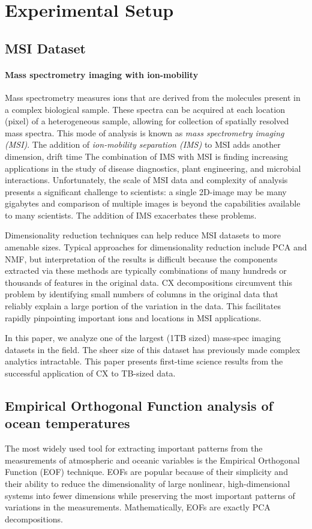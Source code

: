 \section{Experimental Setup}
\label{sec:setup}

\subsection{MSI Dataset}
\paragraph{Mass spectrometry imaging with ion-mobility}
Mass spectrometry measures ions that are derived from the molecules present in a complex biological sample.
These spectra can be acquired at each location (pixel) of a heterogeneous sample, allowing for collection of spatially
resolved mass spectra.
This mode of analysis is known as \textit{mass spectrometry imaging (MSI)}.
The addition of \textit{ion-mobility separation (IMS)} to MSI adds another dimension, drift time
The combination of IMS with MSI is finding increasing applications in the study of disease diagnostics, plant
engineering, and microbial interactions. Unfortunately, the scale of MSI data and complexity of analysis presents a significant challenge to
scientists: a single 2D-image may be many gigabytes and comparison of multiple images is beyond the capabilities
available to many scientists. The addition of IMS exacerbates these problems.

Dimensionality reduction techniques can help reduce MSI datasets to more
amenable sizes.  Typical approaches for dimensionality reduction include PCA
and NMF, but interpretation of the results is difficult because the components
extracted via these methods are typically combinations of many hundreds or
thousands of features in the original data.  CX decompositions circumvent this
problem by identifying small numbers of columns in the original data that
reliably explain a large portion of the variation in the data.  This
facilitates rapidly pinpointing important ions and locations in MSI
applications.

In this paper, we analyze one of the largest (1TB sized) mass-spec imaging
datasets in the field. The sheer size of this dataset has previously made
complex analytics intractable. This paper presents first-time science results
from the successful application of CX to TB-sized data.

\subsection{Empirical Orthogonal Function analysis of ocean temperatures}
The most widely used tool for extracting important patterns from the
measurements of atmospheric and oceanic variables is the Empirical Orthogonal
Function (EOF) technique. EOFs are popular because of their simplicity and
their ability to reduce the dimensionality of large nonlinear, high-dimensional
systems into fewer dimensions while preserving the most important patterns of
variations in the measurements. Mathematically, EOFs are exactly PCA decompositions.

